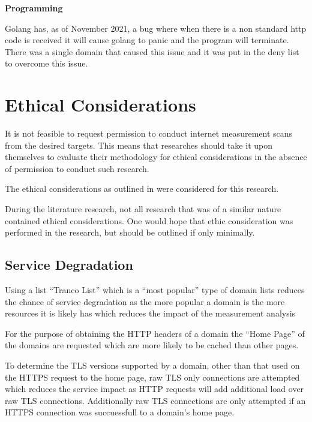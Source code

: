\documentclass{mscreport}
\begin{document}
\vspace{0.6cm} \noindent
\textbf{Programming}

\vspace{0.2cm} \noindent
Golang has, as of November 2021, a bug \cite{noauthor_undated-kp} where when there is a non standard  http code is received it will cause golang to panic and the program will terminate. There was a single domain that caused this issue and it was put in the deny list to overcome this issue.

\newpage

\section{Ethical Considerations}
\label{section:ethics}

It is not feasible to request permission to conduct internet measurement scans from the desired targets. This means that researches should take it upon themselves to evaluate their methodology for ethical considerations in the absence of permission to conduct such research.

\vspace{0.3cm} \noindent
The ethical considerations as outlined in \cite{Amann2017-co,Partridge2016-ph,Durumeric2015-zq,Kumar2017-qw} were considered for this research.

\vspace{0.3cm} \noindent
During the literature research, not all research that was of a similar nature contained ethical considerations. One would hope that ethic consideration was performed in the research, but should be outlined if only minimally.

\subsection{Service Degradation}

Using a list ``Tranco List'' which is a ``most popular'' type of domain lists reduces the chance of service degradation as the more popular a domain is the more resources it is likely has which reduces the impact of the measurement analysis

\vspace{0.3cm} \noindent
For the purpose of obtaining the HTTP headers of a domain the ``Home Page'' of the domains are requested which are more likely to be cached than other pages.

\vspace{0.3cm} \noindent
To determine the TLS versions supported by a domain, other than that used on the HTTPS request to the home page, raw TLS only connections are attempted which reduces the service impact as HTTP requests will add additional load over raw TLS connections. Additionally raw TLS connections are only attempted if an HTTPS connection was succuessfull to a domain's home page.
\end{document}
